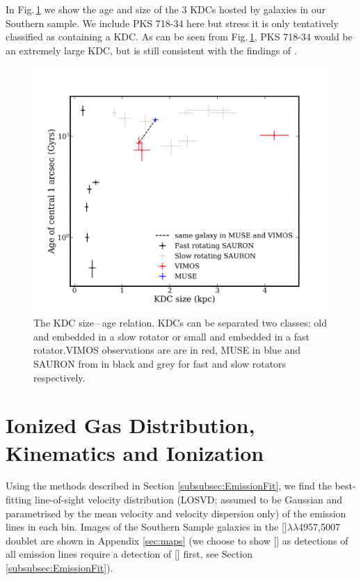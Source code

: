 \documentclass[a4paper,fleqn,usenatbib]{mnras}
\begin{document}
		In Fig.\,\ref{fig:KDC} we show the age and size of the 3 KDCs hosted by galaxies in our Southern sample. We include PKS 718-34 here but stress it is only tentatively classified as containing a KDC. As can be seen from Fig.\,\ref{fig:KDC}, PKS 718-34 would be an extremely large KDC, but is still consistent with the findings of \citet{Kuntschner2010}.

		\begin{figure}
			\includegraphics[width=\columnwidth]{KDC_size_age.png}
			\caption[KDC dichotomy]{The KDC size\,--\,age relation. KDCs can be separated two classes: old and embedded in a slow rotator or small and embedded in a fast rotator.VIMOS observations are are in red, MUSE in blue and SAURON from \citet{Kuntschner2010} in black and grey for fast and slow rotators respectively.}
			\label{fig:KDC}
		\end{figure}

\section{Ionized Gas Distribution, Kinematics and Ionization}
	\label{sec:gas}
	Using the methods described in Section \ref{subsubsec:EmissionFit}, we find the best-fitting line-of-sight velocity distribution (LOSVD; assumed to be Gaussian and parametrised by the mean velocity and velocity dispersion only) of the emission lines in each bin. Images of the Southern Sample galaxies in the []$\lambda\lambda$4957,5007 doublet are shown in Appendix \ref{sec:maps} (we choose to show [] as detections of all emission lines require a detection of [] first, see Section \ref{subsubsec:EmissionFit}). 
\end{document}
